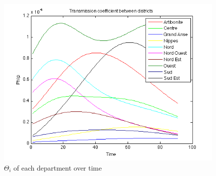 \documentclass[11pt]{article}
\begin{document}
\begin{figure}
  \begin{minipage}[t]{0.8\textwidth}
    \centering
    \includegraphics[width=\textwidth]{Bilder/coeff.png} 
    \caption{$\Theta_{i}$ of each department over time}
	\label{fig:coeff}
  \end{minipage}
\end{figure}
\end{document}

